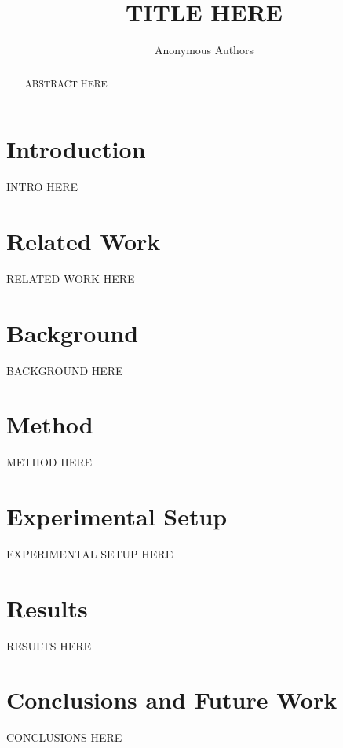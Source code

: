 \documentclass[11pt]{article}
\title{TITLE HERE}
\author{Anonymous Authors}
\date{}
\begin{document}
\maketitle

\begin{abstract}
ABSTRACT HERE
\end{abstract}

\section{Introduction}
\label{sec:intro}
INTRO HERE

\section{Related Work}
\label{sec:related}
RELATED WORK HERE

\section{Background}
\label{sec:background}
BACKGROUND HERE

\section{Method}
\label{sec:method}
METHOD HERE

\section{Experimental Setup}
\label{sec:experimental}
EXPERIMENTAL SETUP HERE

\section{Results}
\label{sec:results}
RESULTS HERE
\begin{table}[ht]
\centering

\caption{Mean final test accuracy (percent), paired over the fixed evaluation seeds.}
\label{tab:verified_results}
\end{table}

\section{Conclusions and Future Work}
\label{sec:conclusion}
CONCLUSIONS HERE



\end{document}
